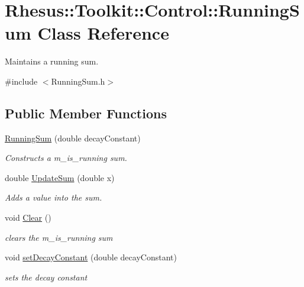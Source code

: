 \hypertarget{class_rhesus_1_1_toolkit_1_1_control_1_1_running_sum}{\section{Rhesus\-:\-:Toolkit\-:\-:Control\-:\-:Running\-Sum Class Reference}
\label{class_rhesus_1_1_toolkit_1_1_control_1_1_running_sum}
}


Maintains a running sum.  




{\ttfamily \#include $<$Running\-Sum.\-h$>$}

\subsection*{Public Member Functions}
\begin{DoxyCompactItemize}
\item 
\hyperlink{class_rhesus_1_1_toolkit_1_1_control_1_1_running_sum_a60f24d9d2be2862267cae3edc40893b9}{Running\-Sum} (double decay\-Constant)
\begin{DoxyCompactList}\small\item\em Constructs a m\-\_\-is\-\_\-running sum. \end{DoxyCompactList}\item 
double \hyperlink{class_rhesus_1_1_toolkit_1_1_control_1_1_running_sum_a3231b7a979b8e6275c8db4e4847a6a74}{Update\-Sum} (double x)
\begin{DoxyCompactList}\small\item\em Adds a value into the sum. \end{DoxyCompactList}\item 
\hypertarget{class_rhesus_1_1_toolkit_1_1_control_1_1_running_sum_aa287c102ed2d4c670be384bf26e63ed3}{void \hyperlink{class_rhesus_1_1_toolkit_1_1_control_1_1_running_sum_aa287c102ed2d4c670be384bf26e63ed3}{Clear} ()}\label{class_rhesus_1_1_toolkit_1_1_control_1_1_running_sum_aa287c102ed2d4c670be384bf26e63ed3}

\begin{DoxyCompactList}\small\item\em clears the m\-\_\-is\-\_\-running sum \end{DoxyCompactList}\item 
void \hyperlink{class_rhesus_1_1_toolkit_1_1_control_1_1_running_sum_afa6047affb831919d1695e2451a74810}{set\-Decay\-Constant} (double decay\-Constant)
\begin{DoxyCompactList}\small\item\em sets the decay constant \end{DoxyCompactList}\end{DoxyCompactItemize}


